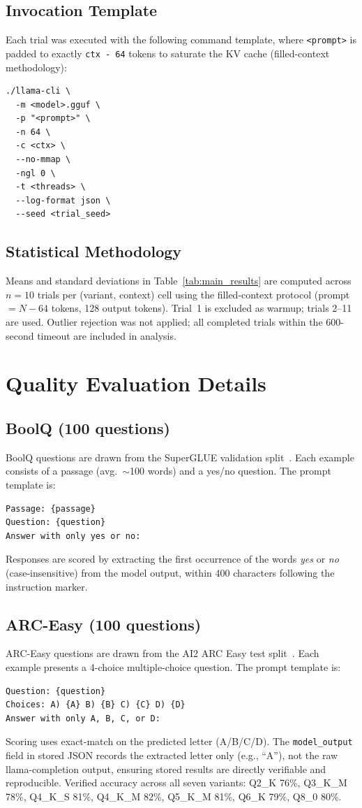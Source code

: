 \documentclass[conference]{IEEEtran}
\begin{document}
\subsection{Invocation Template}

Each trial was executed with the following command template,
where \texttt{<prompt>} is padded to exactly \texttt{ctx - 64} tokens
to saturate the KV cache (filled-context methodology):
\begin{verbatim}
./llama-cli \
  -m <model>.gguf \
  -p "<prompt>" \
  -n 64 \
  -c <ctx> \
  --no-mmap \
  -ngl 0 \
  -t <threads> \
  --log-format json \
  --seed <trial_seed>
\end{verbatim}

\subsection{Statistical Methodology}

Means and standard deviations in Table~\ref{tab:main_results} are computed
across $n{=}10$ trials per (variant, context) cell using the filled-context protocol
(prompt $= N - 64$ tokens, 128 output tokens).
Trial~1 is excluded as warmup; trials 2--11 are used.
Outlier rejection was not applied; all completed trials within the 600-second
timeout are included in analysis.

\section{Quality Evaluation Details}

\subsection{BoolQ (100 questions)}
BoolQ questions are drawn from the SuperGLUE validation split~\cite{boolq}.
Each example consists of a passage (avg.\ $\sim$100 words) and a yes/no question.
The prompt template is:
\begin{verbatim}
Passage: {passage}
Question: {question}
Answer with only yes or no:
\end{verbatim}
Responses are scored by extracting the first occurrence of the words
\emph{yes} or \emph{no} (case-insensitive) from the model output,
within 400 characters following the instruction marker.

\subsection{ARC-Easy (100 questions)}
ARC-Easy questions are drawn from the AI2 ARC Easy test split~\cite{arc}.
Each example presents a 4-choice multiple-choice question.
The prompt template is:
\begin{verbatim}
Question: {question}
Choices: A) {A} B) {B} C) {C} D) {D}
Answer with only A, B, C, or D:
\end{verbatim}
Scoring uses exact-match on the predicted letter (A/B/C/D).
The \texttt{model\_output} field in stored JSON records the extracted letter only
(e.g., ``A''), not the raw llama-completion output, ensuring stored results are
directly verifiable and reproducible. Verified accuracy across all seven variants:
Q2\_K 76\%, Q3\_K\_M 78\%, Q4\_K\_S 81\%, Q4\_K\_M 82\%, Q5\_K\_M 81\%, Q6\_K 79\%, Q8\_0 80\%.
\end{document}
